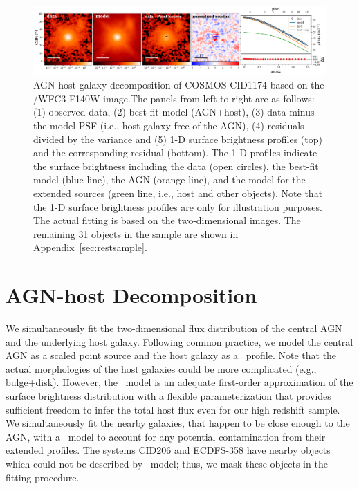 \documentclass[apj]{emulateapj}
\begin{document}
\begin{figure}
\centering
{
\includegraphics[height=0.25\textwidth]{fig/best_fit_CID1174_SB_profile.pdf}
\caption{\label{fig:AGN_decomp} AGN-host galaxy decomposition of COSMOS-CID1174 based on the \hst/WFC3 F140W image.The panels from left to right are as follows: (1) observed data, (2) best-fit model (AGN+host), (3) data minus the model PSF (i.e., host galaxy free of the AGN), (4) residuals divided by the variance and (5) 1-D surface brightness profiles (top) and the corresponding residual (bottom). The 1-D profiles indicate the surface brightness including the data (open circles), the best-fit model (blue line), the AGN (orange line), and the model for the extended sources (green line, i.e., host and other objects). Note that the 1-D surface brightness profiles are only for illustration purposes. The actual fitting is based on the two-dimensional images. The remaining 31 objects in the sample are shown in Appendix~\ref{sec:restsample}.
}}
\end{figure} 

\section{AGN-host Decomposition}
\label{sec:analysis}

We simultaneously fit the two-dimensional flux distribution of the central AGN and the underlying host galaxy. Following common practice, we model the central AGN as a scaled point source and the host galaxy as a \sersic\ profile. Note that the actual morphologies of the host galaxies could be more complicated (e.g., bulge+disk). However, the \sersic\ model is an adequate first-order approximation of the surface brightness distribution with a flexible parameterization that provides sufficient freedom to infer the total host flux even for our high redshift sample. We simultaneously fit the nearby galaxies, that happen to be close enough to the AGN, with a \sersic\ model to account for any potential contamination from their extended profiles. The systems CID206 and ECDFS-358 have nearby objects which could not be described by \sersic\ model; thus, we mask these objects in the fitting procedure.
\end{document}
